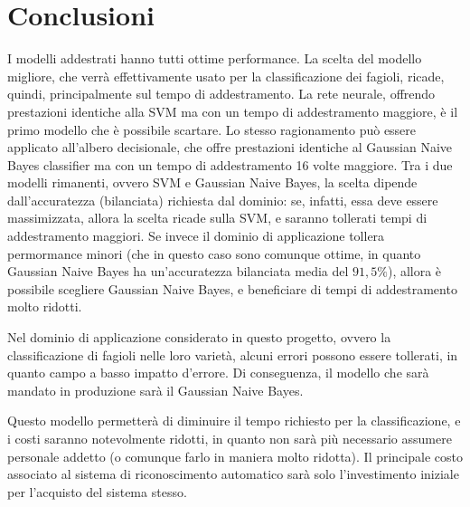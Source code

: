 \section{Conclusioni}
I modelli addestrati hanno tutti ottime performance. La scelta del modello migliore,
che verrà effettivamente usato per la classificazione dei fagioli,
ricade, quindi, principalmente sul tempo di addestramento.
La rete neurale, offrendo prestazioni identiche alla SVM ma con un tempo 
di addestramento maggiore, è il primo modello che è possibile scartare.
Lo stesso ragionamento può essere applicato all'albero decisionale, che offre
prestazioni identiche al Gaussian Naive Bayes classifier ma con un tempo di addestramento
16 volte maggiore.
Tra i due modelli rimanenti, ovvero SVM e Gaussian Naive Bayes, la scelta dipende
dall'accuratezza (bilanciata) richiesta dal dominio: se, infatti, essa deve essere
massimizzata, allora la scelta ricade sulla SVM, e saranno tollerati
tempi di addestramento maggiori.
Se invece il dominio di applicazione tollera permormance minori (che in questo
caso sono comunque ottime, in quanto Gaussian Naive Bayes ha un'accuratezza bilanciata
media del $91,5\%$), allora è possibile scegliere Gaussian Naive Bayes,
e beneficiare di tempi di addestramento molto ridotti.

Nel dominio di applicazione considerato in questo progetto, ovvero la classificazione
di fagioli nelle loro varietà, alcuni errori possono essere tollerati, 
in quanto campo a basso impatto d'errore. Di conseguenza, il modello che
sarà mandato in produzione sarà il Gaussian Naive Bayes.

Questo modello permetterà di diminuire il tempo richiesto per la classificazione,
e i costi saranno notevolmente ridotti, in quanto non sarà più necessario assumere
personale addetto (o comunque farlo in maniera molto ridotta).
Il principale costo associato al sistema di riconoscimento automatico sarà
solo l'investimento iniziale per l'acquisto del sistema stesso.